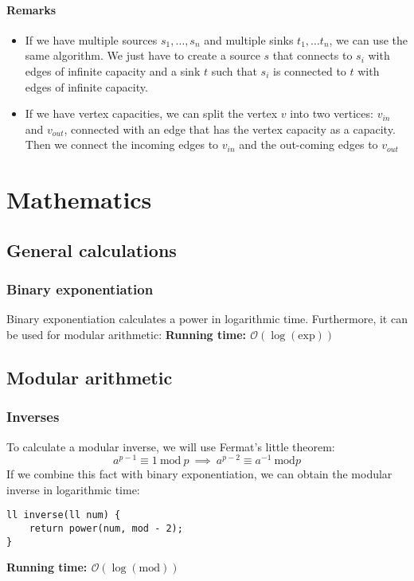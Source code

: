 \documentclass[12pt]{report}
\begin{document}
\subsubsection{Remarks}
\begin{itemize}
	\item If we have multiple sources $s_1,\dots, s_n$ and multiple sinks 
		$t_1,\dots t_n$, we can use the same algorithm. We just have to create a 
		source $s$ that connects to $s_i$ with edges of infinite capacity and
		a sink $t$ such that $s_i$ is connected to $t$ with edges of infinite
		capacity.
		
	\item If we have vertex capacities, we can split the vertex $v$ into two vertices:
		$v_{in}$ and $v_{out}$, connected with an edge that has the vertex 
		capacity as a capacity. Then we connect the incoming edges to $v_{in}$ and 
		the out-coming edges to $v_{out}$


\end{itemize}

\chapter{Mathematics}

\section{General calculations}
\subsection{Binary exponentiation}
Binary exponentiation calculates a power in logarithmic 
time. Furthermore, it can be used for modular arithmetic:
\noindent \textbf{\boldmath Running time: $\mathcal{O}(\log(\mathrm{exp}))$}


\newpage
\section{Modular arithmetic}
\subsection{Inverses}
To calculate a modular inverse, we will use Fermat's little theorem:
\[
	a^{p-1}\equiv 1 \ \mathrm{mod} \ p  \ \implies \  a^{p-2}\equiv a^{-1} \ \mathrm{mod} p
\]
If we combine this fact with binary exponentiation, we can obtain the 
modular inverse in logarithmic time:
\begin{verbatim}
ll inverse(ll num) {
    return power(num, mod - 2);
}
\end{verbatim}
\noindent \textbf{\boldmath Running time: $\mathcal{O}(\log(\mathrm{mod}))$}
\end{document}

